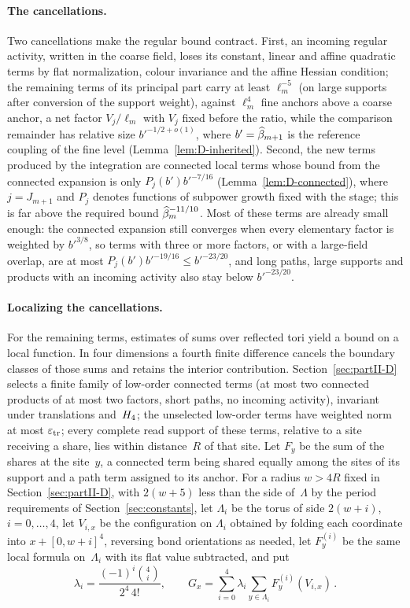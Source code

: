\paragraph{The cancellations.}
Two cancellations make the regular bound contract. First, an incoming regular activity, written in the coarse field, loses its constant, linear and affine quadratic terms by flat normalization, colour invariance and the affine Hessian condition; the remaining terms of its principal part carry at least $\ell_m^{-5}$ (on large supports after conversion of the support weight), against $\ell_m^4$ fine anchors above a coarse anchor, a net factor $V_j/\ell_m$ with $V_j$ fixed before the ratio, while the comparison remainder has relative size $b'^{-1/2+o(1)}$, where $b'=\widehat{\beta}_{m+1}$ is the reference coupling of the fine level (Lemma~\ref{lem:D-inherited}). Second, the new terms produced by the integration are connected local terms whose bound from the connected expansion is only $P_j(b')b'^{-7/16}$ (Lemma~\ref{lem:D-connected}), where $j=J_{m+1}$ and $P_j$ denotes functions of subpower growth fixed with the stage; this is far above the required bound $\widehat{\beta}_m^{-11/10}$. Most of these terms are already small enough: the connected expansion still converges when every elementary factor is weighted by $b'^{3/8}$, so terms with three or more factors, or with a large-field overlap, are at most $P_j(b')b'^{-19/16}\le b'^{-23/20}$, and long paths, large supports and products with an incoming activity also stay below $b'^{-23/20}$. 

\paragraph{Localizing the cancellations.}
For the remaining terms, estimates of sums over reflected tori yield a bound on a local function. In four dimensions a fourth finite difference cancels the boundary classes of those sums and retains the interior contribution. Section~\ref{sec:partII-D} selects a finite family of low-order connected terms (at most two connected products of at most two factors, short paths, no incoming activity), invariant under translations and~$H_4$; the unselected low-order terms have weighted norm at most $\varepsilon_{\rm tr}$; every complete read support of these terms, relative to a site receiving a share, lies within distance~$R$ of that site. Let $F_y$ be the sum of the shares at the site~$y$, a connected term being shared equally among the sites of its support and a path term assigned to its anchor. For a radius $w>4R$ fixed in Section~\ref{sec:partII-D}, with $2(w+5)$ less than the side of~$\Lambda$ by the period requirements of Section~\ref{sec:constants}, let $\Lambda_i$ be the torus of side $2(w+i)$, $i=0,\ldots,4$, let $V_{i,x}$ be the configuration on $\Lambda_i$ obtained by folding each coordinate into $x+[0,w+i]^4$, reversing bond orientations as needed, let $F^{(i)}_y$ be the same local formula on~$\Lambda_i$ with its flat value subtracted, and put
\begin{equation}\label{eq:five-torus}
\lambda_i=\frac{(-1)^i\binom4i}{2^4\,4!},\qquad
G_x=\sum_{i=0}^4\lambda_i\sum_{y\in\Lambda_i}F^{(i)}_y(V_{i,x})\,.
\end{equation}

